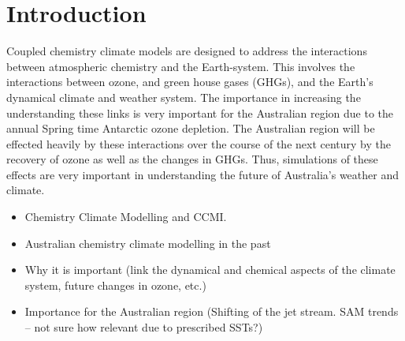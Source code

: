 \section{Introduction} 

Coupled chemistry climate models are designed to address the interactions between atmospheric chemistry and the Earth-system. This involves the interactions between ozone, and green house gases (GHGs), and the Earth's dynamical climate and weather system. The importance in increasing the understanding these links is very important for the Australian region due to the annual Spring time Antarctic ozone depletion. The Australian region will be effected heavily by these interactions over the course of the next century by the recovery of ozone as well as the changes in GHGs. Thus, simulations of these effects are very important in understanding the future of Australia's weather and climate.

\begin{itemize}
\item Chemistry Climate Modelling and CCMI.
\item Australian chemistry climate modelling in the past
\item Why it is important (link the dynamical and chemical aspects of the climate system, future changes in ozone, etc.)
\item Importance for the Australian region (Shifting of the jet stream. SAM trends – not sure how relevant due to prescribed SSTs?)
\end{itemize}